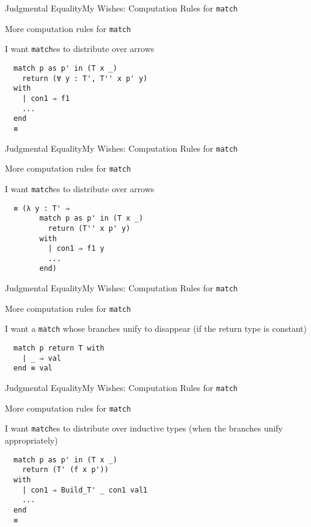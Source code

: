 \documentclass{beamer}
\begin{document}
\begin{frame}[fragile]{Judgmental Equality}{My Wishes: Computation Rules for \texorpdfstring{\texttt{match}}{match}}
  \Large
  \begin{center}
    More computation rules for \texttt{match}
  \end{center}
  I want \texttt{match}es to distribute over arrows
\begin{verbatim}
  match p as p' in (T x _)
    return (∀ y : T', T'' x p' y)
  with
    | con1 ⇒ f1
    ...
  end
  ≡
\end{verbatim}
\end{frame}

\begin{frame}[fragile]{Judgmental Equality}{My Wishes: Computation Rules for \texorpdfstring{\texttt{match}}{match}}
  \Large
  \begin{center}
    More computation rules for \texttt{match}
  \end{center}
  I want \texttt{match}es to distribute over arrows
\begin{verbatim}
  ≡ (λ y : T' ⇒ 
        match p as p' in (T x _)
          return (T'' x p' y)
        with
          | con1 ⇒ f1 y
          ...
        end)
\end{verbatim}
\end{frame}

\begin{frame}[fragile]{Judgmental Equality}{My Wishes: Computation Rules for \texorpdfstring{\texttt{match}}{match}}
  \Large
  \begin{center}
    More computation rules for \texttt{match}
  \end{center}
  I want a \texttt{match} whose branches unify to disappear (if the return type is constant)
\begin{verbatim}
  match p return T with
    | _ ⇒ val
  end ≡ val
\end{verbatim}
\end{frame}

\begin{frame}[fragile]{Judgmental Equality}{My Wishes: Computation Rules for \texorpdfstring{\texttt{match}}{match}}
  \Large
  \begin{center}
    More computation rules for \texttt{match}
  \end{center}
  I want \texttt{match}es to distribute over inductive types (when the branches unify appropriately)
\begin{verbatim}
  match p as p' in (T x _)
    return (T' (f x p'))
  with
    | con1 ⇒ Build_T' _ con1 val1
    ...
  end
  ≡
\end{verbatim}
\end{frame}
\end{document}
